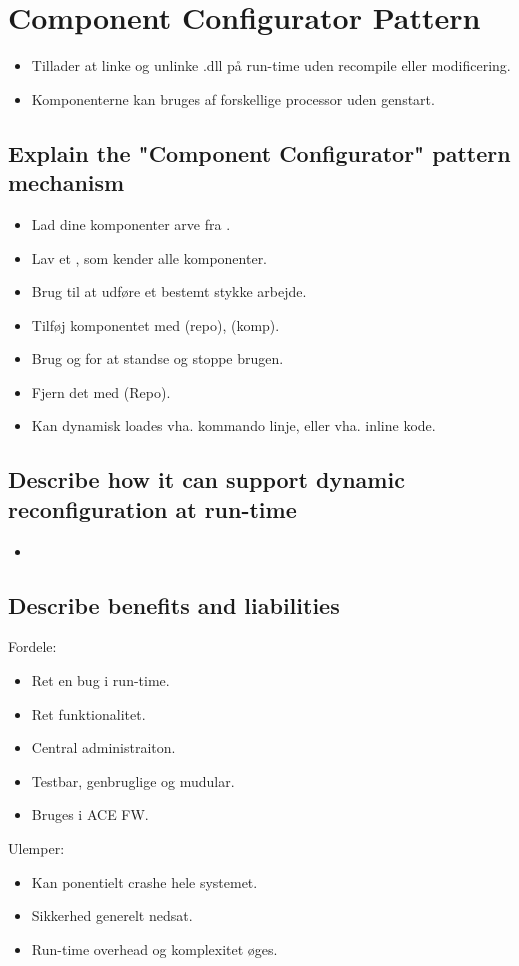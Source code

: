 \documentclass{article}
\begin{document}
\newpage
\section{Component Configurator Pattern}
\begin{itemize}
	\item Tillader at linke og unlinke .dll på run-time uden recompile eller modificering.
	\item Komponenterne kan bruges af forskellige processor uden genstart.
\end{itemize}

\subsection{Explain the "Component Configurator" pattern mechanism}
\begin{itemize}
	\item Lad dine komponenter arve fra .
	\item Lav et , som kender alle komponenter.
	\item Brug  til at udføre et bestemt stykke arbejde.
	\item Tilføj komponentet med  (repo),  (komp).
	\item Brug  og  for at standse og stoppe brugen.
	\item Fjern det med  (Repo).
	\item Kan dynamisk loades vha. kommando linje, eller vha. inline kode.
\end{itemize}


\subsection{Describe how it can support dynamic reconfiguration at run-time}
\begin{itemize}
	\item 
\end{itemize}


\subsection{Describe benefits and liabilities}

Fordele:
\vspace{-10pt}
\begin{itemize}
	\item Ret en bug i run-time.
	\item Ret funktionalitet.
	\item Central administraiton.
	\item Testbar, genbruglige og mudular.
	\item Bruges i ACE FW.
\end{itemize}

Ulemper:
\vspace{-10pt}
\begin{itemize}
	\item Kan ponentielt crashe hele systemet.
	\item Sikkerhed generelt nedsat.
	\item Run-time overhead og komplexitet øges.
\end{itemize}
\end{document}
